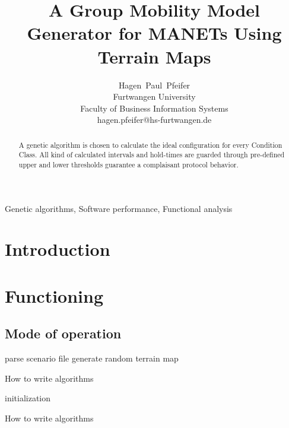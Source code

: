 \documentclass[journal]{IEEEtran}
\begin{document}
\newcommand{\ra}[1]{\renewcommand{\arraystretch}{#1}}

\title{A Group Mobility Model Generator for MANETs Using Terrain Maps}

\author{Hagen~Paul~Pfeifer\\Furtwangen University\\Faculty of Business
Information Systems\\hagen.pfeifer@hs-furtwangen.de}



\maketitle


\begin{abstract}
A genetic algorithm is chosen to calculate the ideal configuration for every
Condition Class. All kind of calculated intervals and hold-times are guarded
through pre-defined upper and lower thresholds guarantee a complaisant protocol
behavior.
\end{abstract}

% 
\begin{keywords}
Genetic algorithms, Software performance, Functional analysis
\end{keywords}
% 
\IEEEpeerreviewmaketitle


\section{Introduction}


\section{Functioning}


\subsection{Mode of operation}

\begin{algorithm}[H]
  \SetLine
  parse scenario file\;
	generate random terrain map\;
  \caption{How to write algorithms}
\end{algorithm}

\begin{algorithm}[H]
  \SetLine
  initialization\;
  \caption{How to write algorithms}
\end{algorithm}
\end{document}
